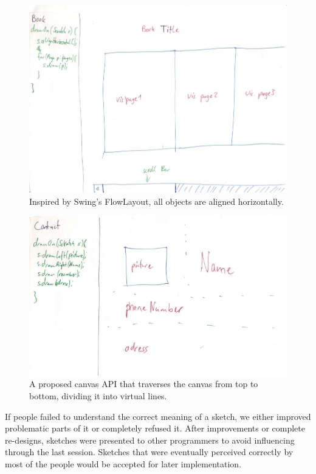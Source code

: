 \documentclass[english]{scrartcl}
\begin{document}
\begin{figure}[h]
	\includegraphics[width=\linewidth]{img/sketches/032.jpg}
	\caption[Bad sketch example: Horizontal and vertical alignment]{Inspired by Swing's FlowLayout, all objects are aligned horizontally.}
\end{figure}

\begin{figure}[h]
	\includegraphics[width=\linewidth]{img/sketches/026.jpg}
	\caption[Bad sketch example: Left-right pattern]{A proposed canvas API that traverses the canvas from top to bottom, dividing it into virtual lines.}
\end{figure}

If people failed to understand the correct meaning of a sketch, we either improved problematic parts of it or completely refused it.
After improvements or complete re-designs, sketches were presented to other programmers to avoid influencing through the last session.
Sketches that were eventually perceived correctly by most of the people would be accepted for later implementation.
\end{document}

